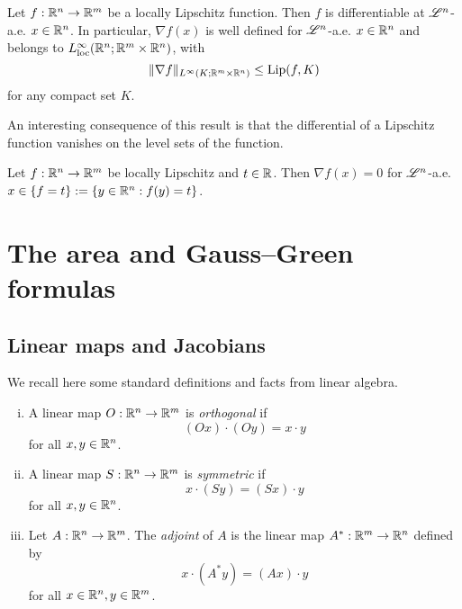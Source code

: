 \begin{theorem} \label{thm:Rademacher}
Let $f : \mathbb{R}^{n} \to \mathbb{R}^{m}$ be a locally Lipschitz function. Then $f$ is differentiable at $\mathscr{L}^{n}$-a.e. $x \in \mathbb{R}^{n}$. In particular, $\nabla f(x)$ is well defined for $\mathscr{L}^{n}$-a.e. $x \in \mathbb{R}^{n}$ and belongs to $L^{\infty}_{\rm loc}(\mathbb{R}^{n}; \mathbb{R}^{m} \times \mathbb{R}^{n})$, with $$\|\nabla f\|_{L^{\infty}(K; \mathbb{R}^{m} \times \mathbb{R}^{n})} \le \operatorname{Lip}(f, K)$$ for any compact set $K$.
\end{theorem}

An interesting consequence of this result is that the differential of a Lipschitz function vanishes on the level sets of the function.

\begin{theorem}
Let $f: \mathbb{R}^{n} \to \mathbb{R}^{m}$ be locally Lipschitz and $t \in \mathbb{R}$. Then $\nabla f(x) = 0$ for $\mathscr{L}^{n}$-a.e. $x \in \{ f = t\} := \{ y \in \mathbb{R}^{n}: f(y) = t\}$.
\end{theorem}

\section{The area and Gauss--Green formulas}


\subsection{Linear maps and Jacobians}

We recall here some standard definitions and facts from linear algebra.

\begin{definition} \hfill
\begin{enumerate}[i)]
\item A linear map $O : \mathbb{R}^{n} \to \mathbb{R}^{m}$ is {\em orthogonal} if $$(Ox) \cdot (Oy) = x \cdot y$$ for all $x, y \in \mathbb{R}^{n}$.
\item A linear map $S: \mathbb{R}^{n} \to \mathbb{R}^{m}$ is {\em symmetric} if $$x \cdot (Sy) = (Sx) \cdot y$$ for all $x, y \in \mathbb{R}^{n}$.
\item Let $A: \mathbb{R}^{n} \to \mathbb{R}^{m}$. The {\em adjoint} of $A$ is the linear map $A^{*}: \mathbb{R}^{m} \to \mathbb{R}^{n}$ defined by $$x \cdot (A^{*} y) = (Ax) \cdot y$$ for all $x \in \mathbb{R}^{n}, y \in \mathbb{R}^{m}$. 
\end{enumerate}
\end{definition}

